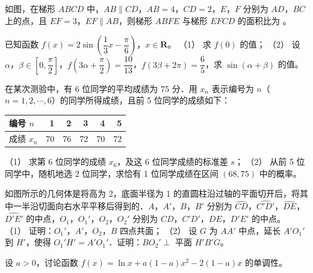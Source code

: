 \begin{question}
如图，在梯形 $ABCD$ 中，$AB\parallel CD$，$AB=4$，$CD=2$，$E$，$F$ 分别为 $AD$，$BC$ 上的点，且 $EF=3$，$EF\parallel AB$，则梯形 $ABFE$ 与梯形 $EFCD$ 的面积比为 \gkblank{}。
\nopagebreak[4]
\begin{center}\end{center}
\nopagebreak[4]
\end{question}
\begin{question}
已知函数 $f(x)=2\sin\left(\dfrac13x-\dfrac{\pi}{6}\right)$，$x\in\mathbf R$。
（1） 求 $f(0)$ 的值；
（2） 设 $\alpha$，$\beta\in\left[0,\dfrac{\pi}{2}\right]$，$f\left(3\alpha+\dfrac{\pi}{2}\right)=\dfrac{10}{13}$，$f(3\beta+2\pi)=\dfrac65$，求 $\sin(\alpha+\beta)$ 的值。
\end{question}
\begin{question}
在某次测验中，有 6 位同学的平均成绩为 75 分．用 $x_n$ 表示编号为 $n$（$n=1,2,\cdots,6$）的同学所得成绩，且前 5 位同学的成绩如下：

\begin{center}
\begin{tabular}{lrrrrr}
\toprule
编号 $n$ & 1 & 2 & 3 & 4 & 5 \\
\midrule
成绩 $x_n$ & 70 & 76 & 72 & 70 & 72 \\
\bottomrule
\end{tabular}
\end{center}

（1） 求第 6 位同学的成绩 $x_6$，及这 6 位同学成绩的标准差 $s$；
（2） 从前 5 位同学中，随机地选 2 位同学，求恰有 1 位同学成绩在区间 $(68,75)$ 中的概率。
\Needspace{0.4\textheight}
\end{question}
\begin{question}
如图所示的几何体是将高为 2，底面半径为 1 的直圆柱沿过轴的平面切开后，将其中一半沿切面向右水平平移后得到的．$A$，$A'$，$B$，$B'$ 分别为 $\widehat{CD}$，$\widehat{C'D'}$，$\widehat{DE}$，$\widehat{D'E'}$ 的中点，$O_1$，$O_1'$，$O_2$，$O_2'$ 分别为 $CD$，$C'D'$，$DE$，$D'E'$ 的中点。
（1） 证明：$O_1'$，$A'$，$O_2$，$B$ 四点共面；
（2） 设 $G$ 为 $AA'$ 中点，延长 $A'O_1'$ 到 $H'$，使得 $O_1'H'=A'O_1'$．证明：$BO_2'\perp$ 平面 $H'B'G$。
\nopagebreak[4]
\begin{center}\end{center}
\nopagebreak[4]
\end{question}
\begin{question}
设 $a>0$，讨论函数 $f(x)=\ln x+a(1-a)x^2-2(1-a)x$ 的单调性。
\end{question}
